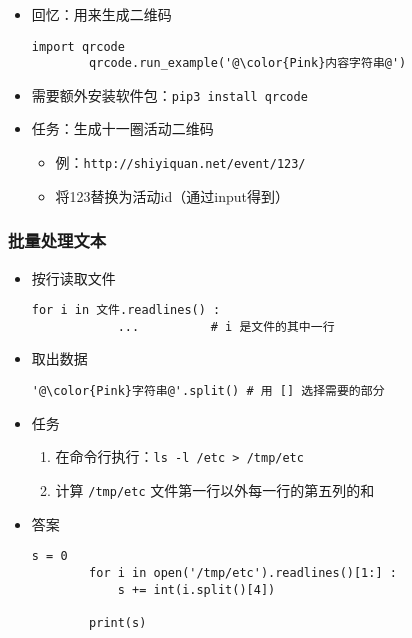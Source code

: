 \begin{CJK}{UTF8}{gbsn}
\begin{frame} [fragile]
	\frametitle{}
	\linespread{1.5}
	\begin{itemize}
	\item 回忆：用来生成二维码
		\begin{lstlisting}[style=pythonstyle, gobble=8, texcl, escapechar=@]
		import qrcode
		qrcode.run_example('@\color{Pink}内容字符串@')
		\end{lstlisting}
	\item 需要额外安装软件包：\texttt{pip3 install qrcode}
	\item 任务：生成十一圈活动二维码
		\begin{itemize}
		\item 例：\texttt{http://shiyiquan.net/event/123/}
		\item 将123替换为活动id（通过input得到）
		\end{itemize}
	\end{itemize}
\end{frame}

\begin{frame} [fragile]
	\frametitle{批量处理文本}
	\linespread{1.25}
	\begin{itemize}
	\item 按行读取文件
		\begin{lstlisting}[style=pythonstyle, gobble=8, texcl]
		for i in 文件.readlines() :
			...			 # i 是文件的其中一行
		\end{lstlisting}
	\item 取出数据
		\begin{lstlisting}[style=pythonstyle, gobble=8, texcl, escapechar=@]
		'@\color{Pink}字符串@'.split()	# 用 [] 选择需要的部分
		\end{lstlisting}
	\item 任务
		\begin{enumerate}
		\item 在命令行执行：\texttt{ls -l /etc > /tmp/etc}
		\item 计算 \texttt{/tmp/etc} 文件第一行以外每一行的第五列的和
		\end{enumerate}
	\item 答案
		\fontsize{2}{2}\selectfont
		\begin{lstlisting}[style=pythonstyle, gobble=8, texcl]
		s = 0
		for i in open('/tmp/etc').readlines()[1:] :
			s += int(i.split()[4])

		print(s)
		\end{lstlisting}
	\end{itemize}
\end{frame}


\end{CJK}
